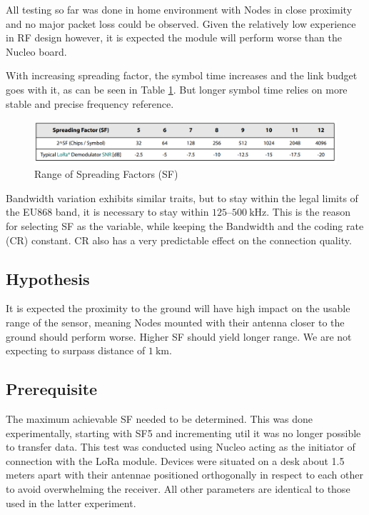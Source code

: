 All testing so far was done in home environment with Nodes in close proximity and no major packet loss could be observed. Given the relatively low experience in RF design however, it is expected the module will perform worse than the Nucleo board.

With increasing spreading factor, the symbol time increases and the link budget goes with it, as can be seen in Table \ref{table:semtech-sf}. But longer symbol time relies on more stable and precise frequency reference. 

\begin{figure}[H]
    \includegraphics[width=\textwidth]{fig/semtech-sf-table.png}
    \caption{\label{table:semtech-sf}Range of Spreading Factors (SF)}
\end{figure}

Bandwidth variation exhibits similar traits, but to stay within the legal limits of the EU868 band, it is necessary to stay within $125\text{--}500~\mathrm{kHz}$. This is the reason for selecting SF as the variable, while keeping the Bandwidth and the coding rate (CR) constant. CR also has a very predictable effect on the connection quality.

\subsection{Hypothesis}
It is expected the proximity to the ground will have high impact on the usable range of the sensor, meaning Nodes mounted with their antenna closer to the ground should perform worse. Higher SF should yield longer range. We are not expecting to surpass distance of $1~\mathrm{km}$.

\subsection{\label{section:range-prerequisite}Prerequisite}
The maximum achievable SF needed to be determined. This was done experimentally, starting with SF5 and incrementing util it was no longer possible to transfer data. This test was conducted using Nucleo acting as the initiator of connection with the LoRa module. Devices were situated on a desk about 1.5 meters apart with their antennae positioned orthogonally in respect to each other to avoid overwhelming the receiver. All other parameters are identical to those used in the latter experiment.

